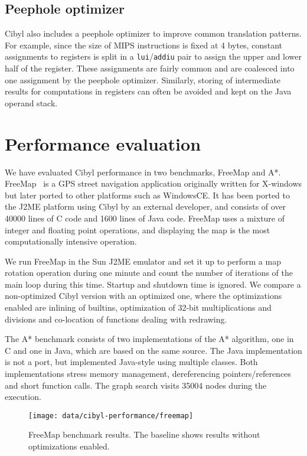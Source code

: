 \subsection{Peephole optimizer}
Cibyl also includes a peephole optimizer to improve common translation
patterns. For example, since the size of MIPS instructions is fixed at 4
bytes, constant assignments to registers is split in a
\texttt{lui}/\texttt{addiu} pair to assign the upper and lower half of the
register. These assignments are fairly common and are coalesced into one
assignment by the peephole optimizer. Similarly, storing of intermediate
results for computations in registers can often be avoided and kept on the
Java operand stack.

\section{Performance evaluation}
\label{sec:cp:evaluation}
We have evaluated Cibyl performance in two benchmarks, FreeMap and A*.
FreeMap~\cite{shabtai07roadmap} is a GPS street navigation application
originally written for X-windows but later ported to other platforms such as
WindowsCE. It has been ported to the J2ME platform using Cibyl by an external
developer, and consists of over 40000 lines of C code and 1600 lines of Java
code. FreeMap uses a mixture of integer and floating point operations, and
displaying the map is the most computationally intensive operation.

We run FreeMap in the Sun J2ME emulator and set it up to perform a map
rotation operation during one minute and count the number of iterations of the
main loop during this time. Startup and shutdown time is ignored. We compare a
non-optimized Cibyl version with an optimized one, where the optimizations
enabled are inlining of builtins, optimization of 32-bit multiplications and
divisions and co-location of functions dealing with redrawing.

The A* benchmark consists of two implementations of the A* algorithm, one in C
and one in Java, which are based on the same source. The Java implementation
is not a port, but implemented Java-style using multiple classes. Both
implementations stress memory management, dereferencing pointers/references
and short function calls. The graph search visits 35004 nodes during the
execution.

\begin{figure}[bth]
  \begin{center}
    \texttt{[image: data/cibyl-performance/freemap]}
    \caption[FreeMap benchmark results]{FreeMap benchmark results. The baseline shows results without
      optimizations enabled.}
    \label{fig:cp:freemap}
  \end{center}
\end{figure}

